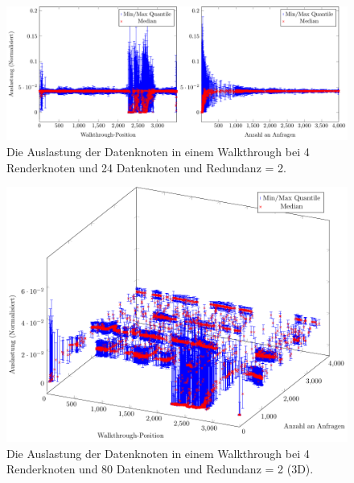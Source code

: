 %


\begin{figure}
\centering
\includegraphics[scale=0.75]{images/diag_cCol_red2_render4_data24_2x.pdf}
\caption{\label{fig:eval:cCol1}Die Auslastung der Datenknoten in einem Walkthrough bei 4 Renderknoten und 24 Datenknoten und Redundanz = 2.}
\end{figure}

\begin{figure}
\centering
\includegraphics[scale=0.75]{images/diag_cCol_red2_render4_data80_3d.pdf}
\caption{\label{fig:eval:cCol2}Die Auslastung der Datenknoten in einem Walkthrough bei 4 Renderknoten und 80 Datenknoten und Redundanz = 2 (3D).}
\end{figure}

